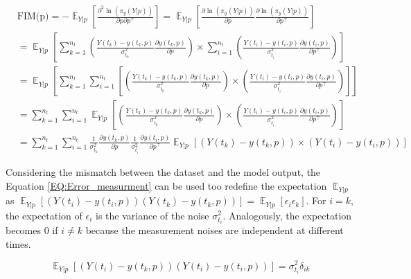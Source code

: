 \documentclass[../Article_Design_of_Experiment.tex]{subfiles}
\begin{document}
	{\scriptsize
	\begin{equation}
		\begin{aligned}
		&\text{FIM(p)} = - \mathop{\mathbb{E}}_{Y|p} \left[ \frac{\partial^2 \ln (\pi_y (Y|p))}{\partial p \partial p^\top} \right] = \mathop{\mathbb{E}}_{Y|p} \left[ \frac{\partial \ln (\pi_y (Y|p))}{\partial p} \frac{\partial \ln (\pi_y (Y|p))}{\partial p^\top} \right] \nonumber \\
		&= \mathop{\mathbb{E}}_{Y|p} \left[ \sum_{k=1}^{n_t} \left( \frac{Y(t_k) - y(t_k, p)}{\sigma_{t_k}^2} \frac{\partial y(t_k, p)}{\partial p} \right) \times  \sum_{i=1}^{n_t} \left( \frac{Y(t_i) - y(t_i, p)}{\sigma_{t_i}^2} \frac{\partial y(t_i, p)}{\partial p^\top} \right) \right] \nonumber \\
		&= \mathop{\mathbb{E}}_{Y|p} \left[ \sum_{k=1}^{n_t} \sum_{i=1}^{n_t} \left[ \left( \frac{Y(t_k) - y(t_k, p)}{\sigma_{t_k}^2} \frac{\partial y(t_k, p)}{\partial p} \right) \times \left( \frac{Y(t_i) - y(t_i, p)}{\sigma_{t_i}^2} \frac{\partial y(t_i, p)}{\partial p^\top} \right) \right] \right] \nonumber \\
		&= \sum_{k=1}^{n_t} \sum_{i=1}^{n_t} \mathop{\mathbb{E}}_{Y|p} \left[ \left( \frac{Y(t_k) - y(t_k, p)}{\sigma_{t_k}^2} \frac{\partial y(t_k, p)}{\partial p} \right) \times \left( \frac{Y(t_i) - y(t_i, p)}{\sigma_{t_i}^2} \frac{\partial y(t_i, p)}{\partial p^\top} \right) \right] \nonumber \\
		&= \sum_{k=1}^{n_t} \sum_{i=1}^{n_t} \frac{1}{\sigma_{t_k}^2} \frac{\partial y(t_k, p)}{\partial p} \frac{1}{\sigma_{t_i}^2} \frac{\partial y(t_i, p)}{\partial p^\top} \mathop{\mathbb{E}}_{Y|p} \left[ \left( Y(t_k) - y(t_k, p) \right) \times \left( Y(t_i) - y(t_i, p) \right) \right] 
	\end{aligned} 
	\end{equation} }
	
	Considering the mismatch between the dataset and the model output, the Equation \ref{EQ:Error_measurment} can be used too redefine the expectation $\mathop{\mathbb{E}}_{Y|p}$ as $\mathop{\mathbb{E}}_{Y|p} \left[ \left( Y(t_i) - y(t_i, p) \right) \left( Y(t_k) - y(t_k, p) \right) \right] = \mathop{\mathbb{E}}_{Y|p} \left[ \epsilon_i \epsilon_k \right]$. For $i=k$, the expectation of $\epsilon_i$ is the variance of the noise $\sigma_{t_i}^2$. Analogously, the expectation becomes 0 if $i \neq k$ because the measurement noises are independent at different times.
	
	{\footnotesize
	\begin{equation}
		\mathop{\mathbb{E}}_{Y|p} \left[ \left( Y(t_i) - y(t_k, p) \right) \left( Y(t_i) - y(t_i, p) \right) \right] = \sigma_{t_i}^2 \delta_{ik}
	\end{equation} }
	
\end{document}
